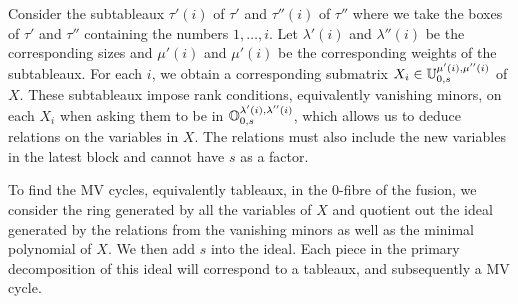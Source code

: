\documentclass[draft]{article}
\begin{document}
Consider the subtableaux $\tau'(i)$ of $\tau'$ and $\tau''(i)$ of $\tau''$ where we take the boxes of $\tau'$ and $\tau''$ containing the numbers $1,\dots,i$. Let $\lambda'(i)$ and $\lambda''(i)$ be the corresponding sizes and $\mu'(i)$ and $\mu'(i)$ be the corresponding weights of the subtableaux. For each $i$, we obtain a corresponding submatrix $X_i \in \mathbb U^{\mu'(i), \mu''(i)}_{0,s}$ of $X$. These subtableaux impose rank conditions, equivalently vanishing minors, on each $X_i$ when asking them to be in $\mathbb O^{\lambda'(i), \lambda''(i)}_{0,s}$, which allows us to deduce relations on the variables in $X$. The relations must also include the new variables in the latest block and cannot have $s$ as a factor.

To find the MV cycles, equivalently tableaux, in the $0$-fibre of the fusion, we consider the ring generated by all the variables of $X$ and quotient out the ideal generated by the relations from the vanishing minors as well as the minimal polynomial of $X$. We then add $s$ into the ideal. Each piece in the primary decomposition of this ideal will correspond to a tableaux, and subsequently a MV cycle.





\end{document}
